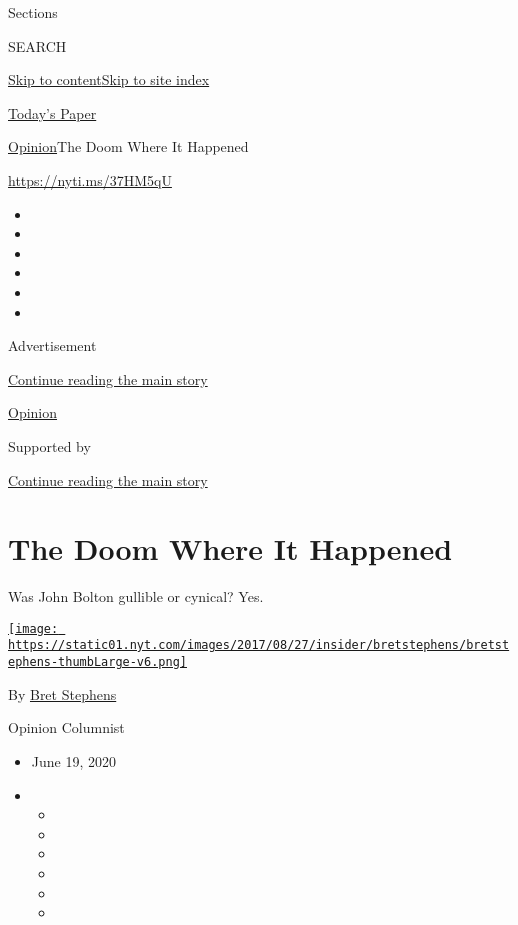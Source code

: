 Sections

SEARCH

\protect\hyperlink{site-content}{Skip to
content}\protect\hyperlink{site-index}{Skip to site index}

\href{https://myaccount.nytimes.com/auth/login?response_type=cookie\&client_id=vi}{}

\href{https://www.nytimes.com/section/todayspaper}{Today's Paper}

\href{/section/opinion}{Opinion}\textbar{}The Doom Where It Happened

\href{https://nyti.ms/37HM5qU}{https://nyti.ms/37HM5qU}

\begin{itemize}
\item
\item
\item
\item
\item
\item
\end{itemize}

Advertisement

\protect\hyperlink{after-top}{Continue reading the main story}

\href{/section/opinion}{Opinion}

Supported by

\protect\hyperlink{after-sponsor}{Continue reading the main story}

\hypertarget{the-doom-where-it-happened}{%
\section{The Doom Where It Happened}\label{the-doom-where-it-happened}}

Was John Bolton gullible or cynical? Yes.

\href{https://www.nytimes.com/by/bret-stephens}{\texttt{[image: https://static01.nyt.com/images/2017/08/27/insider/bretstephens/bretstephens-thumbLarge-v6.png]}}

By \href{https://www.nytimes.com/by/bret-stephens}{Bret Stephens}

Opinion Columnist

\begin{itemize}
\item
  June 19, 2020
\item
  \begin{itemize}
  \item
  \item
  \item
  \item
  \item
  \item
  \end{itemize}
\end{itemize}

